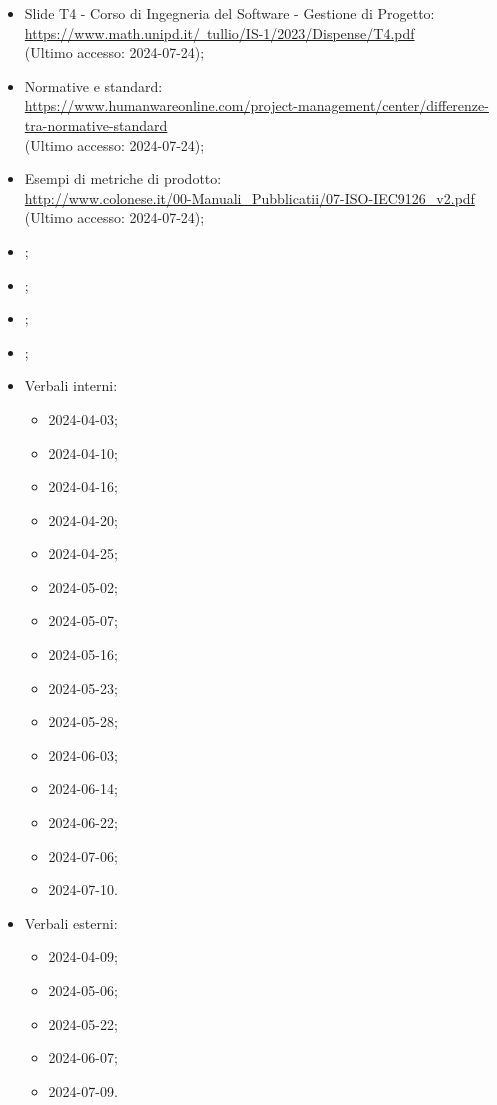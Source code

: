 \begin{itemize}
  \item Slide T4 - Corso di Ingegneria del Software - Gestione di Progetto: \\ \href{https://www.math.unipd.it/~tullio/IS-1/2023/Dispense/T4.pdf}{https://www.math.unipd.it/~tullio/IS-1/2023/Dispense/T4.pdf}  \\ (Ultimo accesso: 2024-07-24);
  \item Normative e standard: \\ \href{https://www.humanwareonline.com/project-management/center/differenze-tra-normative-standard}{https://www.humanwareonline.com/project-management/center/differenze-tra-normative-standard}  \\ (Ultimo accesso: 2024-07-24);
  \item Esempi di metriche di prodotto: \\ \href{http://www.colonese.it/00-Manuali_Pubblicatii/07-ISO-IEC9126_v2.pdf}{http://www.colonese.it/00-Manuali\_Pubblicatii/07-ISO-IEC9126\_v2.pdf} \\ (Ultimo accesso: 2024-07-24);
  \item \PianoDiProgetto;
  \item \PianoDiQualifica;
  \item \AnalisiDeiRequisiti;
  \item \Glossario;
  \item Verbali interni:
  \begin{itemize}
    \item 2024-04-03;
    \item 2024-04-10;
    \item 2024-04-16;
    \item 2024-04-20;
    \item 2024-04-25;
    \item 2024-05-02;
    \item 2024-05-07;
    \item 2024-05-16;
    \item 2024-05-23;
    \item 2024-05-28;
    \item 2024-06-03;
    \item 2024-06-14;
    \item 2024-06-22;
    \item 2024-07-06;
    \item 2024-07-10.
  \end{itemize}
  \item Verbali esterni:
  \begin{itemize}
    \item 2024-04-09;
    \item 2024-05-06;
    \item 2024-05-22;
    \item 2024-06-07;
    \item 2024-07-09.
  \end{itemize}
\end{itemize}